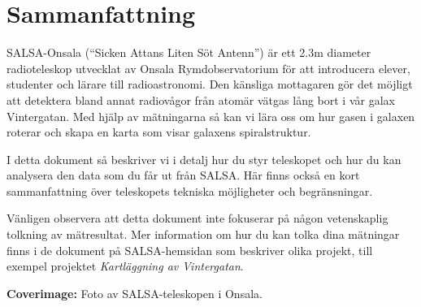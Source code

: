 \chapter*{Sammanfattning}
SALSA-Onsala (``Sicken Attans Liten Söt Antenn'') är ett 2.3m diameter
radioteleskop utvecklat av Onsala Rymdobservatorium för att introducera elever,
studenter och lärare till radioastronomi. Den känsliga mottagaren gör det
möjligt att detektera bland annat radiovågor från atomär vätgas lång bort i vår
galax Vintergatan. Med hjälp av mätningarna så kan vi lära oss om hur gasen i
galaxen roterar och skapa en karta som visar galaxens spiralstruktur.

I detta dokument så beskriver vi i detalj hur du styr teleskopet och hur du
kan analysera den data som du får ut från SALSA. Här finns också en kort
sammanfattning över teleskopets tekniska möjligheter och begränsningar.

Vänligen observera att detta dokument inte fokuserar på någon vetenskaplig
tolkning av mätresultat. Mer information om hur du kan tolka dina mätningar
finns i de dokument på SALSA-hemsidan som beskriver olika projekt, till exempel
projektet \emph{Kartläggning av Vintergatan}.

\vspace{9cm}




{\bf Coverimage:} Foto av SALSA-teleskopen i Onsala.
